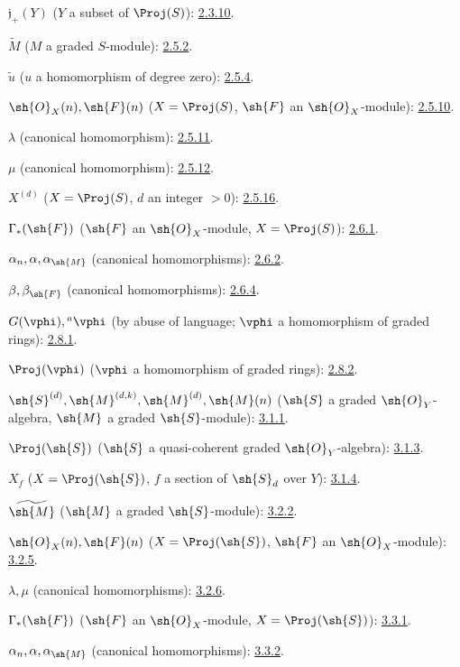 $\mathfrak j_+(Y)$ ($Y$ a subset of $\Proj(S)$): \hyperref[II.2.3.10]{2.3.10}.

$\widetilde M$ ($M$ a graded $S$-module): \hyperref[II.2.5.2]{2.5.2}.

$\widetilde u$ ($u$ a homomorphism of degree zero): \hyperref[II.2.5.4]{2.5.4}.

$\sh{O}_X(n),\sh{F}(n)$
($X=\Proj(S)$, $\sh{F}$ an $\sh{O}_X$-module): \hyperref[II.2.5.10]{2.5.10}.

$\lambda$ (canonical homomorphism): \hyperref[II.2.5.11]{2.5.11}.

$\mu$ (canonical homomorphism): \hyperref[II.2.5.12]{2.5.12}.

$X^{(d)}$ ($X=\Proj(S)$, $d$ an integer $>0$): \hyperref[II.2.5.16]{2.5.16}.

$\Gamma_*(\sh{F})$ ($\sh{F}$ an $\sh{O}_X$-module,
$X=\Proj(S)$): \hyperref[II.2.6.1]{2.6.1}.

$\alpha_n,\alpha,\alpha_{\sh{M}}$ (canonical homomorphisms): \hyperref[II.2.6.2]{2.6.2}.

$\beta,\beta_{\sh{F}}$ (canonical homomorphisms): \hyperref[II.2.6.4]{2.6.4}.

$G(\vphi),{}^a\vphi$ (by abuse of language;
$\vphi$ a homomorphism of graded rings): \hyperref[II.2.8.1]{2.8.1}.

$\Proj(\vphi)$ ($\vphi$ a homomorphism of graded rings): \hyperref[II.2.8.2]{2.8.2}.

$\sh{S}^{(d)},\sh{M}^{(d,k)},\sh{M}^{(d)},\sh{M}(n)$
($\sh{S}$ a graded $\sh{O}_Y$-algebra,
$\sh{M}$ a graded $\sh{S}$-module): \hyperref[II.3.1.1]{3.1.1}.

$\Proj(\sh{S})$ ($\sh{S}$ a quasi-coherent graded
$\sh{O}_Y$-algebra): \hyperref[II.3.1.3]{3.1.3}.

$X_f$ ($X=\Proj(\sh{S})$, $f$ a section of $\sh{S}_d$ over $Y$): \hyperref[II.3.1.4]{3.1.4}.

$\widetilde{\sh{M}}$ ($\sh{M}$ a graded $\sh{S}$-module): \hyperref[II.3.2.2]{3.2.2}.

$\sh{O}_X(n),\sh{F}(n)$
($X=\Proj(\sh{S})$, $\sh{F}$ an $\sh{O}_X$-module): \hyperref[II.3.2.5]{3.2.5}.

$\lambda,\mu$ (canonical homomorphisms): \hyperref[II.3.2.6]{3.2.6}.

$\Gamma_*(\sh{F})$ ($\sh{F}$ an $\sh{O}_X$-module,
$X=\Proj(\sh{S})$): \hyperref[II.3.3.1]{3.3.1}.

$\alpha_n,\alpha,\alpha_{\sh{M}}$ (canonical homomorphisms): \hyperref[II.3.3.2]{3.3.2}.

